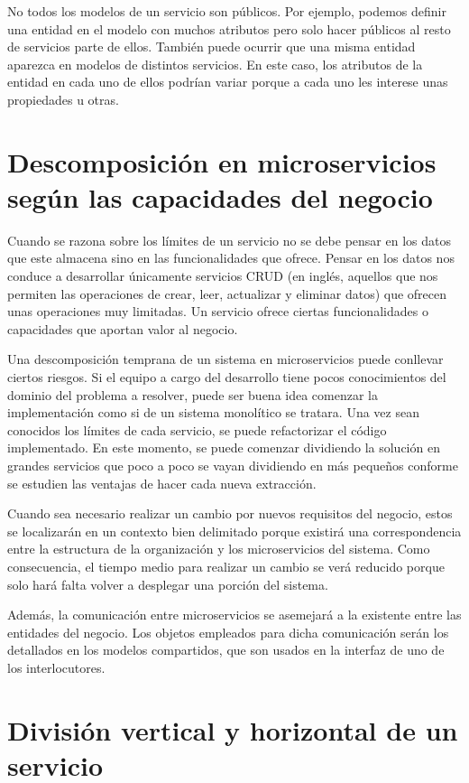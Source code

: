 \documentclass[11pt,a4paper]{article}
\begin{document}
No todos los modelos de un servicio son públicos. Por ejemplo, podemos definir una entidad en el modelo con muchos atributos pero solo hacer públicos al resto de servicios parte de ellos. También puede ocurrir que una misma entidad aparezca en modelos de distintos servicios. En este caso, los atributos de la entidad en cada uno de ellos podrían variar porque a cada uno les interese unas propiedades u otras.


\section{Descomposición en microservicios según las capacidades del negocio}

Cuando se razona sobre los límites de un servicio no se debe pensar en los datos que este almacena sino en las funcionalidades que ofrece. Pensar en los datos nos conduce a desarrollar únicamente servicios CRUD (en inglés, aquellos que nos permiten las operaciones de crear, leer, actualizar y eliminar datos) que ofrecen unas operaciones muy limitadas. Un servicio ofrece ciertas funcionalidades o capacidades que aportan valor al negocio.

Una descomposición temprana de un sistema en microservicios puede conllevar ciertos riesgos. Si el equipo a cargo del desarrollo tiene pocos conocimientos del dominio del problema a resolver, puede  ser buena idea comenzar la implementación como si de un sistema monolítico se tratara. Una vez sean conocidos los límites de cada servicio, se puede refactorizar el código implementado. En este momento, se puede comenzar dividiendo la solución en grandes servicios que poco a poco se vayan dividiendo en más pequeños conforme se estudien las ventajas de hacer cada nueva extracción.

Cuando sea necesario realizar un cambio por nuevos requisitos del negocio, estos se localizarán en un contexto bien delimitado porque existirá una correspondencia entre la estructura de la organización y los microservicios del sistema. Como consecuencia, el tiempo medio para realizar un cambio se verá reducido porque solo hará falta volver a desplegar una porción del sistema.

Además, la comunicación entre microservicios se asemejará a la existente entre las entidades del negocio. Los objetos empleados para dicha comunicación serán los detallados en los modelos compartidos, que son usados en la interfaz de uno de los interlocutores.

\section{División vertical y horizontal de un servicio}
\end{document}
